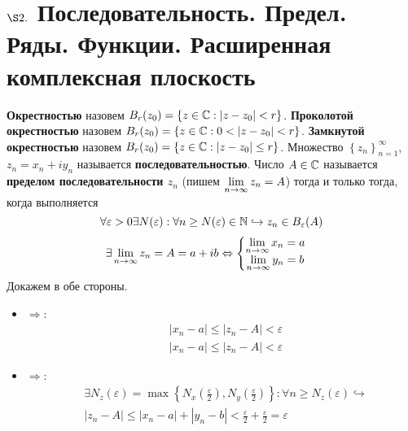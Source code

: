 \section{$\S 2.$ Последовательность. Предел. Ряды. Функции. Расширенная
  комплексная плоскость}
\Def
\textbf{Окрестностью} назовем $B_r(z_0) = \left\{ z \in \mathbb{C}: \left| z-z_0
    \right| < r \right\}$. \textbf{Проколотой окрестностью} назовем $B_r(z_0) =
\left\{ z \in \mathbb{C}: 0 < \left| z-z_0 \right| < r \right\}$. \textbf{Замкнутой
  окрестностью} назовем $B_r(z_0) = \left\{ z \in \mathbb{C}: \left| z-z_0\right| \leq
    r \right\}$.
\Def
Множество $\left\{ z_n \right\}_{n=1}^\infty$, $z_n  = x_n + iy_n$ называется
\textbf{последовательностью}.
\Def
Число $A \in \mathbb{C}$ называется \textbf{пределом последовательности $z_n$} (пишем
$\displaystyle \lim_{n \to \infty}z_n = A$) тогда и только тогда, когда выполняется
\begin{equation}\label{(2.1)}
    \forall \varepsilon > 0 \exists N(\varepsilon):\forall n \geq N(\varepsilon)\in \mathbb{N} \hookrightarrow z_n \in B_{\varepsilon}(A)
\end{equation}
\asm
\begin{align*}
  & \exists \lim_{n \to \infty}z_n = A = a+ib \Leftrightarrow \left\{ \begin{matrix}
          \displaystyle \lim_{n \to \infty}x_n = a \\
          \displaystyle \lim_{n \to \infty}y_n = b
      \end{matrix} \right.
\end{align*}
\pr Докажем в обе стороны.
\begin{itemize}
    \item $\Rightarrow$:
    \begin{align*}
      & \left| x_n - a \right| \leq \left| z_n - A \right| < \varepsilon
    \end{align*}
    \begin{align*}
      & \left| x_n - a \right| \leq \left| z_n - A \right| < \varepsilon
    \end{align*}
    \item $\Rightarrow$:
    \begin{align*}
      & \exists N_z(\varepsilon) = \max\left\{ N_x\left( \frac{\varepsilon}{2} \right), N_y\left( \frac{\varepsilon}{2} \right) \right\}: \forall n \geq N_z(\varepsilon) \hookrightarrow \\
      & \left| z_n-A \right|\leq \left| x_n-a \right|+\left| y_n-b \right| < \frac{\varepsilon}{2} +\frac{\varepsilon}{2} = \varepsilon
    \end{align*}
\end{itemize}
